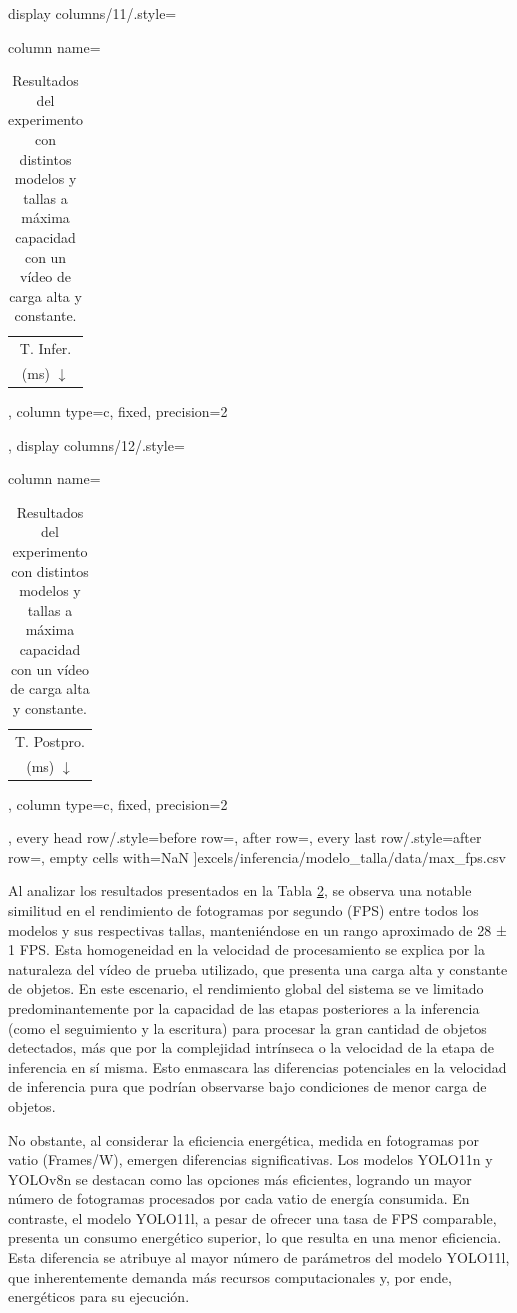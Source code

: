 \documentclass[11pt,spanish,listoffigures,listoftables]{tfgetsinf}
\begin{document}
\begin{table}[H]
{       display columns/11/.style={column name=\begin{tabular}[c]{@{}c@{}}T. Infer.\\(ms) $\downarrow$\end{tabular}, column type={c}, fixed, precision=2},
       display columns/12/.style={column name=\begin{tabular}[c]{@{}c@{}}T. Postpro.\\(ms) $\downarrow$\end{tabular}, column type={c}, fixed, precision=2},
       every head row/.style={before row=\toprule, after row=\midrule},
       every last row/.style={after row=\bottomrule},
       empty cells with={NaN}
   ]{excels/inferencia/modelo_talla/data/max_fps.csv}
   }
   \caption[Resultados del experimento con distintos modelos y tallas a máxima capacidad con un vídeo de carga alta y constante]{Resultados del experimento con distintos modelos y tallas a máxima capacidad con un vídeo de carga alta y constante.}
   \label{tab:experimento_modelo_talla_max_fps_carga_alta_constante}
\end{table}

Al analizar los resultados presentados en la Tabla \ref{tab:experimento_modelo_talla_max_fps_carga_alta_constante}, se observa una notable similitud en el rendimiento de fotogramas por segundo (FPS) entre todos los modelos y sus respectivas tallas, manteniéndose en un rango aproximado de 28 ± 1 FPS. Esta homogeneidad en la velocidad de procesamiento se explica por la naturaleza del vídeo de prueba utilizado, que presenta una carga alta y constante de objetos. En este escenario, el rendimiento global del sistema se ve limitado predominantemente por la capacidad de las etapas posteriores a la inferencia (como el seguimiento y la escritura) para procesar la gran cantidad de objetos detectados, más que por la complejidad intrínseca o la velocidad de la etapa de inferencia en sí misma. Esto enmascara las diferencias potenciales en la velocidad de inferencia pura que podrían observarse bajo condiciones de menor carga de objetos.

No obstante, al considerar la eficiencia energética, medida en fotogramas por vatio (Frames/W), emergen diferencias significativas. Los modelos YOLO11n y YOLOv8n se destacan como las opciones más eficientes, logrando un mayor número de fotogramas procesados por cada vatio de energía consumida. En contraste, el modelo YOLO11l, a pesar de ofrecer una tasa de FPS comparable, presenta un consumo energético superior, lo que resulta en una menor eficiencia. Esta diferencia se atribuye al mayor número de parámetros del modelo YOLO11l, que inherentemente demanda más recursos computacionales y, por ende, energéticos para su ejecución.
\end{document}
